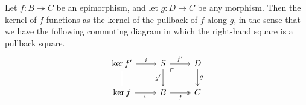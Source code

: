 \documentclass[main.tex]{subfiles}
\begin{document}
\begin{lemma}
  \label{lemma:pullback_preserves_kernel}
  Let $f\colon B \twoheadrightarrow C$ be an epimorphism, and let $g\colon D \to C$ be any morphism. Then the kernel of $f$ functions as the kernel of the pullback of $f$ along $g$, in the sense that we have the following commuting diagram in which the right-hand square is a pullback square.
  \begin{equation*}
    \begin{tikzcd}
      \ker f'
      \arrow[d, equals]
      \arrow[r, "i"]
      & S
      \arrow[dr, phantom, "\ulcorner", very near start]
      \arrow[r, "f'"]
      \arrow[d, swap, "g'"]
      & D
      \arrow[d, "g"]
      \\
      \ker f
      \arrow[r, swap, "\iota"]
      & B
      \arrow[r, twoheadrightarrow, swap, "f"]
      & C
    \end{tikzcd}
  \end{equation*}
\end{lemma}
\end{document}
